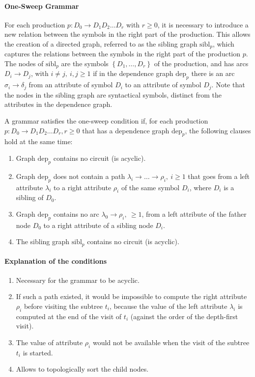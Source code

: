 \paragraph*{One-Sweep Grammar}
For each production $p: D_0 \rightarrow D_1 D_2 \ldots D_r$ with $r \geq 0$, it is necessary to introduce a new relation between the symbols in the right part of the production.
This allows the creation of a directed graph, referred to as the sibling graph $\text{sibl}_p$, which captures the relations between the symbols in the right part of the production $p$.
The nodes of $\text{sibl}_p$ are the symbols $\left\{ D_1, \ldots , D_r \right\}$ of the production, and has arcs $D_i \rightarrow D_j$, with $i \neq j, \ i,j \geq 1$ if in the dependence graph $\text{dep}_p$ there is an arc $\sigma_i \rightarrow \delta_j$ from an attribute of symbol $D_i$ to an attribute of symbol $D_j$.
Note that the nodes in the sibling graph are syntactical symbols, distinct from the attributes in the dependence graph.

A grammar satisfies the one-sweep condition if, for each production $p : D_0 \rightarrow D_1 D_2 \ldots D_r,  r \geq 0$ that has a dependence graph $\text{dep}_p$, the following clauses hold at the same time:
\begin{enumerate}
    \item Graph $\text{dep}_p$ contains no circuit (is acyclic).
    \item Graph $\text{dep}_p$ does not contain a path $\lambda_i \rightarrow \ldots \rightarrow \rho_i, \ i \geq 1$ that goes from a left attribute $\lambda_i$ to a right attribute $\rho_i$ of the same symbol $D_i$, where $D_i$ is a sibling of $D_0$.
    \item Graph $\text{dep}_p$ contains no arc $\lambda_0 \rightarrow \rho_i, \ \geq 1$, from a left attribute of the father node $D_0$ to a right attribute of a sibling node $D_i$.
    \item The sibling graph $\text{sibl}_p$ contains no circuit (is acyclic).
\end{enumerate}

\paragraph*{Explanation of the conditions}
\begin{enumerate}
    \item Necessary for the grammar to be acyclic.
    \item If such a path existed, it would be impossible to compute the right attribute $\rho_i$ before visiting the subtree $t_i$, because the value of the left attribute $\lambda_i$ is computed at the end of the visit of $t_i$ (against the order of the depth-first visit).
    \item The value of attribute $\rho_i$ would not be available when the visit of the subtree $t_i$ is started.
    \item Allows to topologically sort the child nodes.
\end{enumerate}

